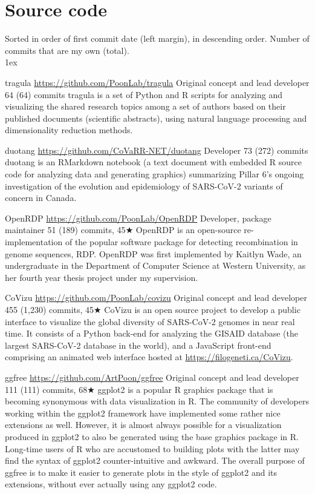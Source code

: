 
\section{Source code}

Sorted in order of first commit date (left margin), in descending order.
Number of commits that are my own (total).\\

\parskip 1ex


{tragula}
{\url{https://github.com/PoonLab/tragula}}
{Original concept and lead developer}
{64 (64) commits}
{tragula is a set of Python and R scripts for analyzing and visualizing the shared research topics among a set of authors based on their published documents (scientific abstracts), using natural language processing and dimensionality reduction methods.}


{duotang}
{\url{https://github.com/CoVaRR-NET/duotang}}
{Developer}
{73 (272) commits}
{duotang is an RMarkdown notebook (a text document with embedded R source code for analyzing data and generating graphics) summarizing Pillar 6's ongoing investigation of the evolution and epidemiology of SARS-CoV-2 variants of concern in Canada.}

{OpenRDP}
{\url{https://github.com/PoonLab/OpenRDP}}
{Developer, package maintainer}
{51 (189) commits, 45$\bigstar$}
{
OpenRDP is an open-source re-implementation of the popular software package for detecting recombination in genome sequences, RDP.
OpenRDP was first implemented by Kaitlyn Wade, an undergraduate in the Department of Computer Science at Western University, as her fourth year thesis project under my supervision.
}


{CoVizu}
{\url{https://github.com/PoonLab/covizu}}
{Original concept and lead developer}
{455 (1,230) commits, 45$\bigstar$}
{CoVizu is an open source project to develop a public interface to visualize the global diversity of SARS-CoV-2 genomes in near real time.
It consists of a Python back-end for analyzing the GISAID database (the largest SARS-CoV-2 database in the world), and a JavaScript front-end comprising an animated web interface hosted at \url{https://filogeneti.ca/CoVizu}.}


{ggfree}
{\url{https://github.com/ArtPoon/ggfree}}
{Original concept and lead developer}
{111 (111) commits, 68$\bigstar$}
{ggplot2 is a popular R graphics package that is becoming synonymous with data visualization in R. The community of developers working within the ggplot2 framework have implemented some rather nice extensions as well. However, it is almost always possible for a visualization produced in ggplot2 to also be generated using the base graphics package in R. Long-time users of R who are accustomed to building plots with the latter may find the syntax of ggplot2 counter-intuitive and awkward. The overall purpose of ggfree is to make it easier to generate plots in the style of ggplot2 and its extensions, without ever actually using any ggplot2 code.}

